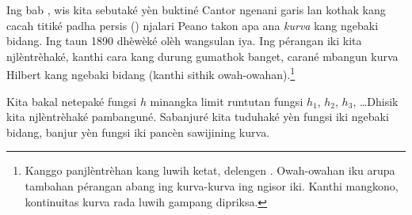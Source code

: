 \documentclass[../../../include/open-logic-section]{subfiles}
\begin{document}


Ing bab , wis kita sebutaké yèn buktiné Cantor
ngenani garis lan kothak kang cacah titiké padha persis
() njalari Peano
takon apa ana \emph{kurva} kang ngebaki bidang. Ing taun 1890
dhèwèké olèh wangsulan iya. Ing pérangan iki kita njlèntrèhaké,
kanthi cara kang durung gumathok banget, carané mbangun kurva Hilbert
kang ngebaki bidang (kanthi sithik owah-owahan).\footnote{Kanggo
panjlèntrèhan kang luwih ketat, delengen \cite{Rose2010}.
Owah-owahan iku arupa tambahan pérangan abang ing kurva-kurva
ing ngisor iki. Kanthi mangkono, kontinuitas kurva rada luwih
gampang dipriksa.}

Kita bakal netepaké fungsi $h$ minangka limit runtutan fungsi
$h_1$, $h_2$, $h_3$, \dots\@ Dhisik kita njlèntrèhaké pambanguné.
Sabanjuré kita tuduhaké yèn fungsi iki ngebaki bidang, banjur
yèn fungsi iki pancèn sawijining kurva.
\end{document}
